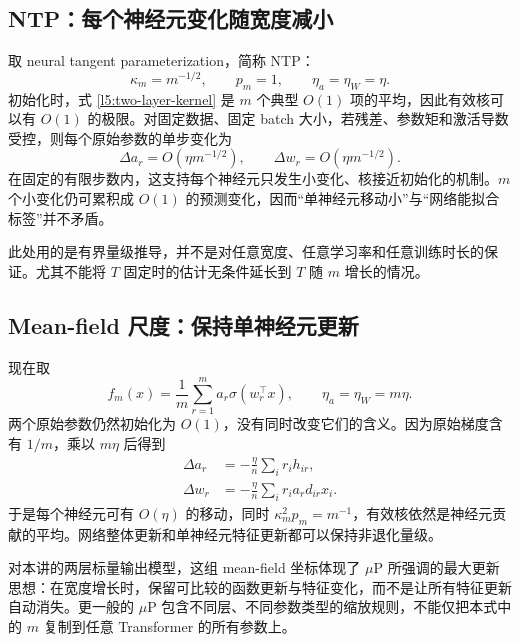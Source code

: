 \subsection{NTP：每个神经元变化随宽度减小}

取 neural tangent parameterization，简称 NTP：
\begin{equation}
 \kappa_m=m^{-1/2},
 \qquad p_m=1,
 \qquad \eta_a=\eta_W=\eta.
 \label{l5:ntp-scaling}
\end{equation}
初始化时，式 \eqref{l5:two-layer-kernel} 是 $m$ 个典型 $O(1)$ 项的平均，因此有效核可以有 $O(1)$ 的极限。对固定数据、固定 batch 大小，若残差、参数矩和激活导数受控，则每个原始参数的单步变化为
\begin{equation}
 \Delta a_r=O(\eta m^{-1/2}),
 \qquad \Delta w_r=O(\eta m^{-1/2}).
 \label{l5:ntp-movement}
\end{equation}
在固定的有限步数内，这支持每个神经元只发生小变化、核接近初始化的机制。$m$ 个小变化仍可累积成 $O(1)$ 的预测变化，因而“单神经元移动小”与“网络能拟合标签”并不矛盾。

此处用的是有界量级推导，并不是对任意宽度、任意学习率和任意训练时长的保证。尤其不能将 $T$ 固定时的估计无条件延长到 $T$ 随 $m$ 增长的情况。

\subsection{Mean-field 尺度：保持单神经元更新}

现在取
\begin{equation}
 \boxed{f_m(x)=\frac1m\sum_{r=1}^m a_r\sigma(w_r^\top x)},
 \qquad
 \boxed{\eta_a=\eta_W=m\eta}.
 \label{l5:mf-scaling}
\end{equation}
两个原始参数仍然初始化为 $O(1)$，没有同时改变它们的含义。因为原始梯度含有 $1/m$，乘以 $m\eta$ 后得到
\begin{align}
 \Delta a_r&=-\frac\eta n\sum_i r_i h_{ir},\label{l5:mf-update-a}\\
 \Delta w_r&=-\frac\eta n\sum_i r_i a_r d_{ir}x_i.\label{l5:mf-update-w}
\end{align}
于是每个神经元可有 $O(\eta)$ 的移动，同时
$\kappa_m^2p_m=m^{-1}$，有效核依然是神经元贡献的平均。网络整体更新和单神经元特征更新都可以保持非退化量级。

对本讲的两层标量输出模型，这组 mean-field 坐标体现了 $\mu$P 所强调的最大更新思想：在宽度增长时，保留可比较的函数更新与特征变化，而不是让所有特征更新自动消失。更一般的 $\mu$P 包含不同层、不同参数类型的缩放规则，不能仅把本式中的 $m$ 复制到任意 Transformer 的所有参数上\citep{YangHu2021,Yang2022}。

